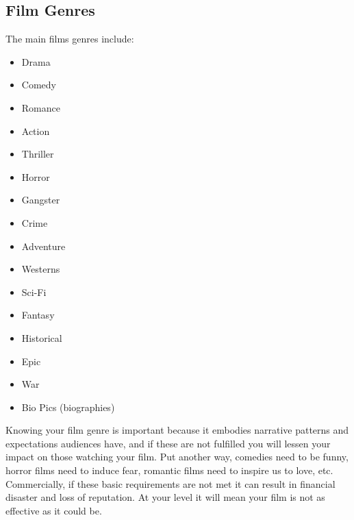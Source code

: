 \documentclass[
]{book}
\providecommand{\tightlist}{%
  \setlength{\itemsep}{0pt}\setlength{\parskip}{0pt}}
\begin{document}
\hypertarget{film-genres}{%
\subsection*{Film Genres}\label{film-genres}}

The main films genres include:

\begin{itemize}
\tightlist
\item
  Drama\\
\item
  Comedy\\
\item
  Romance\\
\item
  Action\\
\item
  Thriller\\
\item
  Horror\\
\item
  Gangster\\
\item
  Crime\\
\item
  Adventure\\
\item
  Westerns\\
\item
  Sci-Fi\\
\item
  Fantasy\\
\item
  Historical\\
\item
  Epic\\
\item
  War\\
\item
  Bio Pics (biographies)
\end{itemize}

Knowing your film genre is important because it embodies narrative patterns and expectations audiences have, and if these are not fulfilled you will lessen your impact on those watching your film. Put another way, comedies need to be funny, horror films need to induce fear, romantic films need to inspire us to love, etc. Commercially, if these basic requirements are not met it can result in financial disaster and loss of reputation. At your level it will mean your film is not as effective as it could be.
\end{document}
